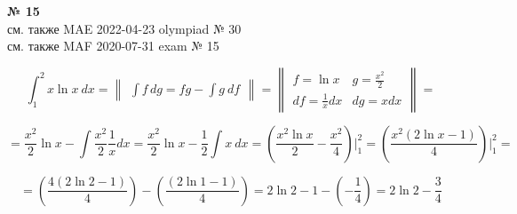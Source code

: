 \documentclass{article}
\begin{document}
\textbf{№ 15} 
\\
см. также {\color{red}MAE} 2022-04-23 olympiad № 30 \\
см. также {\color{blue}MAF} 2020-07-31 exam № 15

$$ \int_{1}^{2} x\ln{x} \ dx 
= \begin{Vmatrix} \int f \,dg = fg - \int g \ df \end{Vmatrix} =
  \begin{Vmatrix} f = \ln{x} &  g = \frac{x^2}{2} \\
                 df = \frac{1}{x}dx  & dg = x dx \end{Vmatrix} = $$

$$ = \frac{x^2}{2}\ln{x} - \int \frac{x^2}{2} \frac{1}{x}dx
= \frac{x^2}{2}\ln{x} - \frac{1}{2}\int x \ dx
= \left( \frac{x^2\ln{x}}{2} - \frac{x^2}{4} \right) \bigg\vert_{1}^{2}
= \left( \frac{x^2(2\ln{x} - 1)}{4} \right) \bigg\vert_{1}^{2} 
= $$

$$ = \left( \frac{4(2\ln{2} - 1)}{4} \right) - \left( \frac{(2\ln{1} - 1)}{4} \right)
= 2\ln{2} - 1 - \left( -\frac{1}{4} \right)
= 2\ln{2} - \frac{3}{4}$$
\end{document}
